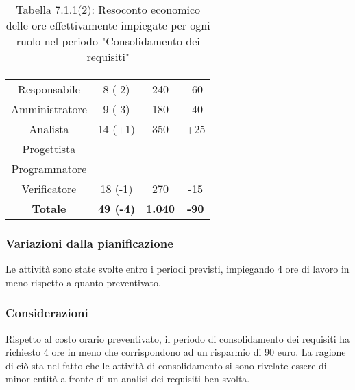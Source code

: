 \renewcommand{\arraystretch}{1.4}
\begin{table}[H]
\begin{center}
\begin{tabular}{|c|c|c|c|}
\hline
\rowcolor{title_row}
\textbf{\color{title_text}{Ruolo}}  & \textbf{\color{title_text}{Ore}} & \textbf{\color{title_text}{Costo in \euro}} & \textbf{\color{title_text}{Differenza al preventivo in \euro}} \\ \hline
Responsabile    & 8 (-2) & 240 & -60 \\ \hline
Amministratore  & 9 (-3) & 180 & -40 \\ \hline
Analista        & 14 (+1) & 350 & +25 \\ \hline
Progettista     & & &  \\ \hline
Programmatore   & & &  \\ \hline
Verificatore    & 18 (-1) & 270 & -15  \\ \hline
\textbf{Totale} & \textbf{49 (-4)}    & \textbf{1.040} & \textbf{-90} \\ \hline
\end{tabular}
\caption{Tabella 7.1.1(2): Resoconto economico delle ore effettivamente impiegate per ogni ruolo nel periodo "Consolidamento dei requisiti"\label{}}
\end{center}
\end{table}
\renewcommand{\arraystretch}{1}


\subsubsection{Variazioni dalla pianificazione}
Le attività sono state svolte entro i periodi previsti, impiegando 4 ore di lavoro in meno rispetto a quanto preventivato.

\subsubsection{Considerazioni}
Rispetto al costo orario preventivato, il periodo di consolidamento dei requisiti ha richiesto 4
ore in meno che corrispondono ad un risparmio di 90 euro. La ragione di ciò sta nel fatto che le attività di consolidamento si sono rivelate essere
di minor entità a fronte di un analisi dei requisiti ben svolta.
\pagebreak
